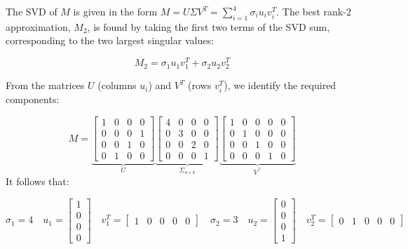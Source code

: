 \documentclass{article}
\begin{document}
{\begin{flushleft}
The SVD of $M$ is given in the form $M = U \Sigma V^T = \sum_{i=1}^4 \sigma_i u_i v_i^T$.
The best rank-2 approximation, $M_2$, is found by taking the first two terms of the SVD sum, corresponding to the two largest singular values:
\end{flushleft}

$$M_2 = \sigma_1 u_1 v_1^T + \sigma_2 u_2 v_2^T$$

\begin{flushleft}
  From the matrices $U$ (columns $u_i$) and $V^T$ (rows $v_i^T$), we identify the required components:
\end{flushleft}

\[
M =
\underbrace{\begin{bmatrix}
    1 & 0 & 0 & 0\\
    0 & 0 & 0 & 1\\
    0 & 0 & 1 & 0\\
    0 & 1 & 0 & 0
\end{bmatrix}}_{U}
\underbrace{\begin{bmatrix}
    4 & 0 & 0 & 0\\
    0 & 3 & 0 & 0\\
    0 & 0 & 2 & 0\\
    0 & 0 & 0 & 1
\end{bmatrix}}_{\Sigma_{4\times4}}
\underbrace{\begin{bmatrix}
    1 & 0 & 0 & 0 & 0\\
    0 & 1 & 0 & 0 & 0\\
    0 & 0 & 1 & 0 & 0\\
    0 & 0 & 0 & 1 & 0
\end{bmatrix}}_{V^\top}
\]
It follows that:

$$\sigma_1 = 4 \quad u_1 = \begin{bmatrix} 1 \\ 0 \\ 0 \\ 0 \end{bmatrix} \quad v_1^T = \begin{bmatrix} 1 & 0 & 0 & 0 & 0 \end{bmatrix}\quad \sigma_2 = 3 \quad u_2 = \begin{bmatrix} 0 \\ 0 \\ 0 \\ 1 \end{bmatrix} \quad v_2^T = \begin{bmatrix} 0 & 1 & 0 & 0 & 0 \end{bmatrix}$$

}
\end{document}
